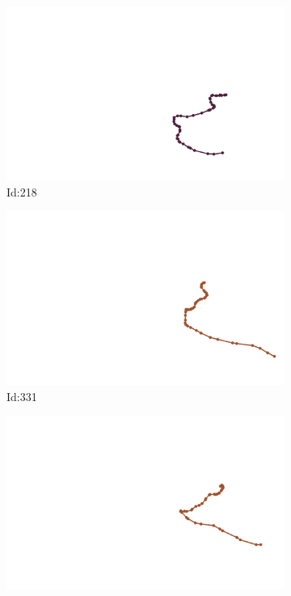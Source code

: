 \documentclass[12pt,twoside]{report}
\begin{document}
\begin{figure}
\centering
\begin{subfigure}[b]{0.20\textwidth}
\centering
\includegraphics[width=\textwidth]{../../trajectories/218.png}
\caption{Id:218}
\end{subfigure}
\begin{subfigure}[b]{0.20\textwidth}
\centering
\includegraphics[width=\textwidth]{../../trajectories/331.png}
\caption{Id:331}
\end{subfigure}
\begin{subfigure}[b]{0.20\textwidth}
\centering
\includegraphics[width=\textwidth]{../../trajectories/502.png}

\end{subfigure}
\end{figure}
\end{document}
